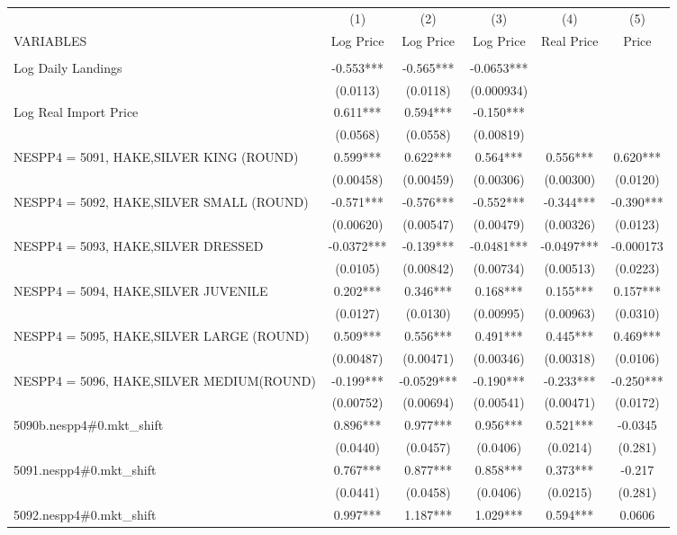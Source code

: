 \begin{tabular}{lccccc} \hline
 & (1) & (2) & (3) & (4) & (5) \\
VARIABLES & Log Price & Log Price & Log Price & Real Price & Price \\ \hline
 &  &  &  &  &  \\
Log Daily Landings & -0.553*** & -0.565*** & -0.0653*** &  &  \\
 & (0.0113) & (0.0118) & (0.000934) &  &  \\
Log Real Import Price & 0.611*** & 0.594*** & -0.150*** &  &  \\
 & (0.0568) & (0.0558) & (0.00819) &  &  \\
NESPP4 = 5091, HAKE,SILVER KING (ROUND) & 0.599*** & 0.622*** & 0.564*** & 0.556*** & 0.620*** \\
 & (0.00458) & (0.00459) & (0.00306) & (0.00300) & (0.0120) \\
NESPP4 = 5092, HAKE,SILVER SMALL (ROUND) & -0.571*** & -0.576*** & -0.552*** & -0.344*** & -0.390*** \\
 & (0.00620) & (0.00547) & (0.00479) & (0.00326) & (0.0123) \\
NESPP4 = 5093, HAKE,SILVER DRESSED & -0.0372*** & -0.139*** & -0.0481*** & -0.0497*** & -0.000173 \\
 & (0.0105) & (0.00842) & (0.00734) & (0.00513) & (0.0223) \\
NESPP4 = 5094, HAKE,SILVER JUVENILE & 0.202*** & 0.346*** & 0.168*** & 0.155*** & 0.157*** \\
 & (0.0127) & (0.0130) & (0.00995) & (0.00963) & (0.0310) \\
NESPP4 = 5095, HAKE,SILVER LARGE (ROUND) & 0.509*** & 0.556*** & 0.491*** & 0.445*** & 0.469*** \\
 & (0.00487) & (0.00471) & (0.00346) & (0.00318) & (0.0106) \\
NESPP4 = 5096, HAKE,SILVER MEDIUM(ROUND) & -0.199*** & -0.0529*** & -0.190*** & -0.233*** & -0.250*** \\
 & (0.00752) & (0.00694) & (0.00541) & (0.00471) & (0.0172) \\
5090b.nespp4\#0.mkt\_shift & 0.896*** & 0.977*** & 0.956*** & 0.521*** & -0.0345 \\
 & (0.0440) & (0.0457) & (0.0406) & (0.0214) & (0.281) \\
5091.nespp4\#0.mkt\_shift & 0.767*** & 0.877*** & 0.858*** & 0.373*** & -0.217 \\
 & (0.0441) & (0.0458) & (0.0406) & (0.0215) & (0.281) \\
5092.nespp4\#0.mkt\_shift & 0.997*** & 1.187*** & 1.029*** & 0.594*** & 0.0606 \\

\end{tabular}
